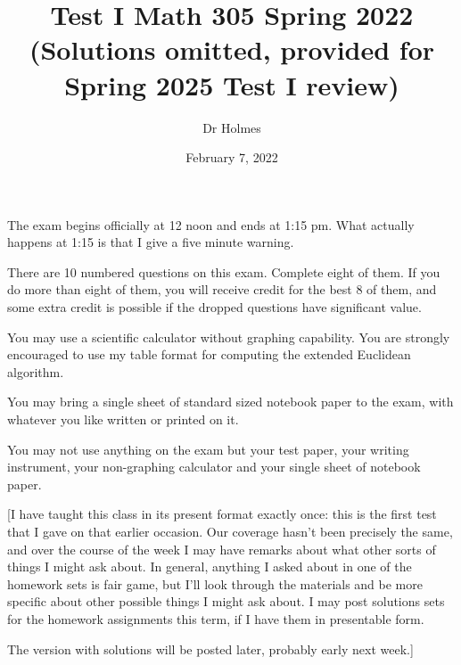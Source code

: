\documentclass[12pt]{article}
\title{Test I Math 305 Spring 2022 (Solutions omitted, provided for Spring 2025 Test I review)}
\author{Dr Holmes}
\date{February 7, 2022}
\begin{document}
\maketitle

The exam begins officially at 12 noon and ends at 1:15 pm.  What actually happens at 1:15 is that I give a five minute warning.

There are 10 numbered questions on this exam.  Complete eight of them.  If you do more than eight of them, you will receive credit for the best 8 of them, and some extra credit is possible if the dropped questions have significant value.

You may use a scientific calculator without graphing capability.  You are strongly encouraged to use my table format for computing the extended Euclidean algorithm.

You may bring a single sheet of standard sized notebook paper to the exam, with whatever you like written or printed on it.

You may not use anything on the exam but your test paper, your writing instrument, your non-graphing calculator and your single sheet of notebook paper.

[I have taught this class in its present format exactly once:  this is the first test that I gave on that earlier occasion.
Our coverage hasn't been precisely the same, and over the course of the week I may have remarks about what other sorts of things I might ask about.  In general, anything I asked about in one of the homework sets is fair game, but I'll look through the materials and be more specific about other possible things I might ask about.  I may post solutions sets for the homework assignments this term, if I have them in presentable form.

The version with solutions will be posted later, probably early next week.]

\newpage
\end{document}
